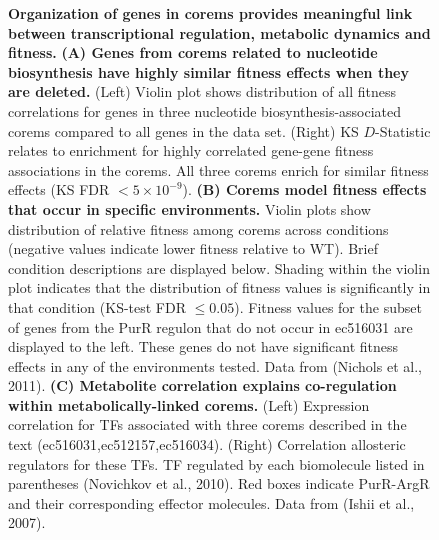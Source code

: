 \begin{figure}[!b]
\centering
{}
\caption{{\bf Organization of genes in corems provides meaningful link between transcriptional regulation, metabolic dynamics and fitness.} 
{\bf (A) Genes from corems related to nucleotide biosynthesis have highly
  similar fitness effects when they are deleted.} (Left) Violin plot
  shows distribution of all fitness correlations for genes in three
  nucleotide biosynthesis-associated corems compared to all genes in
  the data set. (Right) KS $D$-Statistic relates to enrichment for
  highly correlated gene-gene fitness associations in the corems. All
  three corems enrich for similar fitness effects (KS FDR $< 5\times 10^{-9}$).
  {\bf (B) Corems model fitness effects that occur in specific
  environments.} Violin plots show distribution of relative fitness
  among corems across conditions (negative values indicate lower
  fitness relative to WT). Brief condition descriptions are displayed
  below. Shading within the violin plot indicates that the
  distribution of fitness values is significantly in that condition
  (KS-test FDR $\leq 0.05$). Fitness values for the subset of genes from
  the PurR regulon that do not occur in ec516031 are displayed to the
  left. These genes do not have significant fitness effects in any of
  the environments tested. Data from (Nichols et al., 2011). {\bf (C)
  Metabolite correlation explains co-regulation within
  metabolically-linked corems.} (Left) Expression correlation for TFs
  associated with three corems described in the text
  (ec516031,ec512157,ec516034). (Right) Correlation allosteric
  regulators for these TFs. TF regulated by each biomolecule listed in
  parentheses (Novichkov et al., 2010). Red boxes indicate PurR-ArgR
  and their corresponding effector molecules. Data from (Ishii et al.,
  2007).
}
\label{fig:suppfig6}
\vspace{-.1in}
\end{figure}
